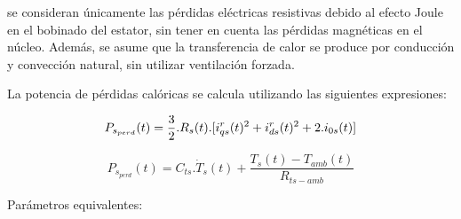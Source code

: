 \documentclass{article}
\begin{document}
    se consideran únicamente las pérdidas eléctricas resistivas debido al efecto Joule en el bobinado del 
    estator, sin tener en cuenta las pérdidas magnéticas en el núcleo. Además, se asume que la 
    transferencia de calor se produce por conducción y convección natural, sin utilizar ventilación forzada.

    La potencia de pérdidas calóricas se calcula utilizando las siguientes expresiones:

    \begin{equation}\label{termico1}
        P_{s_{perd}}(t) =  \frac{3}{2}.R_{s}(t).[i_{qs}^r(t)^2+i_{ds}^r(t)^2+2.i_{0s}(t)]\\
    \end{equation}
    
    \begin{equation}\label{termico2}
        P_{s_{perd}}(t) = C_{ts}.\dot{T}_{s}(t) + \frac{T_{s}(t)-T_{amb}(t)}{R_{ts-amb}}
    \end{equation}

    \noindent Parámetros equivalentes:\\
\end{document}
